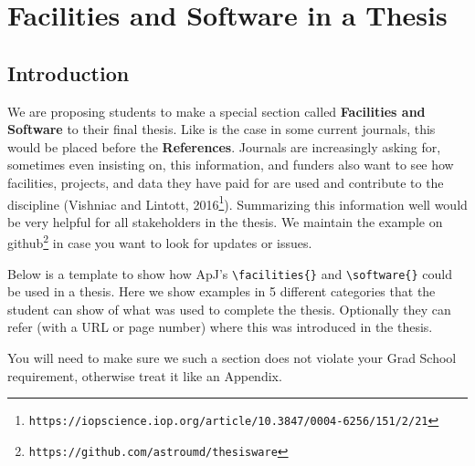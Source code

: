 \documentclass[12pt]{article}
\begin{document}
\section{Facilities and Software in a Thesis}


\subsection{Introduction}

\label{random}

We are proposing %
students to make a special section called {\bf Facilities and
  Software} to their final thesis. Like is the case in some current
journals, this would be placed before the {\bf References}. Journals
are increasingly asking for, sometimes even insisting on, this
information, and funders also want to see how facilities, projects,
and data they have paid for are used and contribute to the
discipline
(Vishniac and Lintott, 2016\footnote{\tt https://iopscience.iop.org/article/10.3847/0004-6256/151/2/21}).
Summarizing this information well would be very helpful
for all stakeholders in the thesis. We maintain the example
on github\footnote{\tt https://github.com/astroumd/thesisware} in
case you want to look for updates or issues. 


Below is a template to show how ApJ's \verb+\facilities{}+ and
\verb+\software{}+ could be used in a thesis. Here we show examples in
5 different categories that the student can show of what was used to
complete the thesis. Optionally they can refer (with a URL or page
number) where this was introduced in the thesis.

You will need to make sure we such a section does not
violate your Grad School requirement, otherwise treat it like an Appendix.



\end{document}
